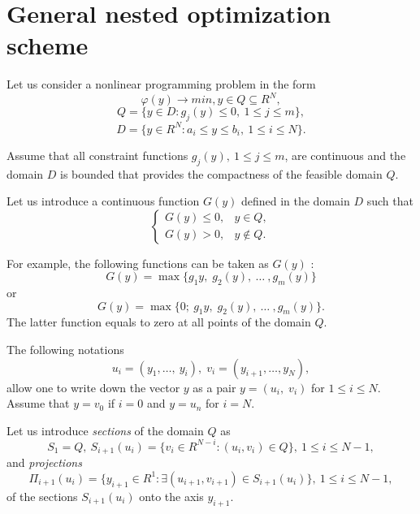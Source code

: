 \section{General nested optimization scheme}
\label{sec:5_1}
Let us consider a nonlinear programming problem in the form 
\begin{equation}
\label{eq:5_1}
\varphi(y)\rightarrow min,y\in Q\subseteq R^N,
\end{equation}
\begin{equation}
\label{eq:5_2}
Q=\{y\in D:g_j(y)\leq 0,\:1\leq j\leq m\},
\end{equation}
\begin{equation}
\label{eq:5_3}
D=\{y\in R^N:a_i\leq y\leq b_i,\:1\leq i\leq N\}.
\end{equation}

Assume that all constraint functions $g_j(y),\:1\leq j\leq m$,  are continuous and the domain $D$  is  bounded that provides the compactness of the feasible domain $Q$. 

Let us introduce a continuous function $G(y)$  defined in the domain $D$  such that
\begin{equation}
\label{eq:5_4}
  \begin{cases}
    G(y)\leq 0, & y\in Q, \\
    G(y)>0, & y\notin Q.
  \end{cases}
\end{equation}

For example, the following functions can be taken as $G(y)$ :
\begin{equation}
\label{eq:5_5}
G(y)=\max\{g_1{y},\;g_2(y),\:\ldots\:,g_m(y)\}
\end{equation}
or
\begin{equation}
\label{eq:5_6}
G(y)=\max\{0;\:g_1{y},\;g_2(y),\:\ldots\:,g_m(y)\}.
\end{equation}
The latter function equals to zero at all points of the domain $Q$.

The following notations
\begin{equation}
\label{eq:5_7}
u_i=(y_1,\ldots,\:y_i),\;v_i=(y_{i+1},\ldots,y_N),
\end{equation}
allow one to write down the vector $y$ as a pair $y=(u_i,\;v_i)$  for $1\leq i\leq N$. Assume that $y=v_0$  if $i=0$  and $y=u_n$  for $i=N$.

Let us introduce  \textit{sections} of the domain $Q$ as
\begin{equation}
\label{eq:5_8}
S_1=Q,\ S_{i+1}(u_i)=\{v_i\in R^{N-i}:(u_i,v_i)\in Q\},\:1\leq i\leq N-1,
\end{equation}
and \textit{projections}
\begin{equation}
\label{eq:5_9}
\Pi_{i+1}(u_i)=\{y_{i+1}\in R^1:\exists (u_{i+1},v_{i+1})\in S_{i+1}(u_i)\},\:1\leq i\leq N-1,
\end{equation}
of the sections $S_{i+1}(u_i)$ onto the axis $y_{i+1}$.

